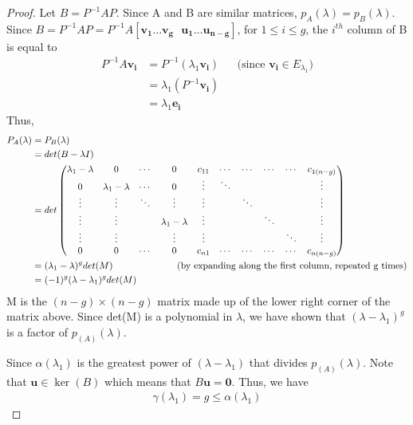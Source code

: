 \documentclass[a4paper,12pt]{article}
\renewcommand{\vec}[1]{\mathbf{#1}}
\begin{document}
\begin{proof}
  Let $B = P^{-1}AP$. Since A and B are similar matrices, $p_{A}(\lambda) = p_{B}(\lambda)$.
  Since $B=P^{-1}AP = P^{-1}A[\vec{v_{1}} \ldots \vec{v_{g}} \text{ } \vec{u_{1}} \ldots \vec{u_{n-g}}]$,
  for $1 \leq i \leq g$, the $i^{th}$ column of B is equal to 
  \begin{align*}
    P^{-1}A\vec{v_{i}} &= P^{-1}(\lambda_{1}\vec{v_{i}}) && \text{(since $\vec{v_{i}} \in E_{\lambda_{1}})$}\\ 
    &= \lambda_{1}(P^{-1}\vec{v_{i}}) \\ 
    &= \lambda_{1}\vec{e_{i}}
  \end{align*}
  Thus, 
  \begin{align*}
    P_{A}(\lambda) &= P_{B}(\lambda) \\ 
    &= det(B-\lambda I)  \\ 
    &= det 
      \begin{pmatrix}
      \lambda_{1} - \lambda & 0 & \cdots & 0 & c_{11} &\cdots & \cdots & \cdots & \cdots & c_{1(n-g)} \\
      0 & \lambda_{1} - \lambda & \cdots & 0 & \vdots &\ddots &  & & & \vdots\\
      \vdots & \vdots  & \ddots & \vdots & \vdots &  & \ddots & & & \vdots \\
      \vdots & \vdots & & \lambda_{1} - \lambda & \vdots &  &  & \ddots & & \vdots\\
      \vdots & \vdots & & \vdots & \vdots &  &  & & \ddots & \vdots  \\
      0 & 0 & \cdots & 0 & c_{n1} & \cdots & \cdots & \cdots & \cdots & c_{n(n-g)}
      \end{pmatrix}\\
    &= (\lambda_{1} - \lambda)^{g} det(M) \hspace{2.4cm} \text{(by expanding along the first column, repeated g times)} \\
    &=(-1)^{g}(\lambda - \lambda_{1})^{g} det(M) 
  \end{align*}
  M is the $(n-g)\times (n-g)$ matrix made up of the lower right corner of the matrix
  above. Since det(M) is a polynomial in $\lambda$, we have shown that 
  $(\lambda - \lambda_{1})^g$ is a factor of $p_(A)(\lambda)$.

  Since $\alpha(\lambda_{1})$ is the greatest power of $(\lambda - \lambda_{1})$
  that divides $p_(A)(\lambda)$. Note that $\vec{u} \in \ker(B)$ which means
  that $B\vec{u} = \vec{0}$. Thus, we have
  \begin{align*}
    \gamma(\lambda_{1}) = g \leq \alpha(\lambda_{1})
  \end{align*}
\end{proof}
\end{document}
